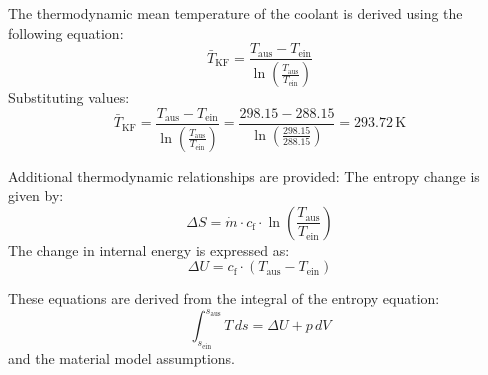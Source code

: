 The thermodynamic mean temperature of the coolant is derived using the following equation:  
\[
\bar{T}_{\text{KF}} = \frac{T_{\text{aus}} - T_{\text{ein}}}{\ln \left( \frac{T_{\text{aus}}}{T_{\text{ein}}} \right)}
\]  
Substituting values:  
\[
\bar{T}_{\text{KF}} = \frac{T_{\text{aus}} - T_{\text{ein}}}{\ln \left( \frac{T_{\text{aus}}}{T_{\text{ein}}} \right)} = \frac{298.15 - 288.15}{\ln \left( \frac{298.15}{288.15} \right)} = 293.72 \, \text{K}
\]  

Additional thermodynamic relationships are provided:  
The entropy change is given by:  
\[
\Delta S = \dot{m} \cdot c_{\text{f}} \cdot \ln \left( \frac{T_{\text{aus}}}{T_{\text{ein}}} \right)
\]  
The change in internal energy is expressed as:  
\[
\Delta U = c_{\text{f}} \cdot \left( T_{\text{aus}} - T_{\text{ein}} \right)
\]  

These equations are derived from the integral of the entropy equation:  
\[
\int_{s_{\text{ein}}}^{s_{\text{aus}}} T \, ds = \Delta U + p \, dV
\]  
and the material model assumptions.